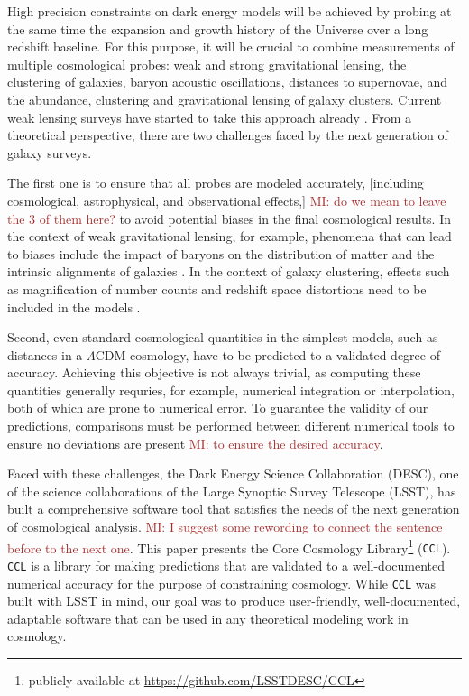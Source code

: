 \documentclass[\docopts]{\docclass}
\newcommand{\mi}[1]{\textcolor{brown}{MI: #1}}
\newcommand{\ccl}{{\tt CCL}\xspace}
\begin{document}
High precision constraints on dark energy models will be achieved by probing at the same time the expansion and growth history of the Universe over a long redshift baseline. For this purpose, it will be crucial to combine measurements of multiple cosmological probes: weak and strong gravitational lensing, the clustering of galaxies, baryon acoustic oscillations, distances to supernovae, and the abundance, clustering and gravitational lensing of galaxy clusters. Current weak lensing surveys have started to take this approach already \citep{Joudaki18,vanUitert18,DEScombined,krause17}. From a theoretical perspective, there are two challenges faced by the next generation of galaxy surveys. 

The first one is to ensure that all probes are modeled accurately, [including cosmological, astrophysical, and observational effects,] \mi{do we mean to leave the 3 of them here?} to avoid potential biases in the final cosmological results. In the context of weak gravitational lensing, for example, phenomena that can lead to biases include the impact of baryons on the distribution of matter and the intrinsic alignments of galaxies \citep[e.g.][]{vanDaalen11,Semboloni11,Troxel14,Krause15,Blazek17}. In the context of galaxy clustering, effects such as magnification of number counts and redshift space distortions need to be included in the models \citep{Alonso15,ghosh18}. 

Second, even standard cosmological quantities in the simplest models, such as distances in a $\Lambda$CDM cosmology, have to be predicted to a validated degree of accuracy. Achieving this objective is not always trivial, as computing these quantities generally requries, for example, numerical integration or interpolation, both of which are prone to numerical error. To guarantee the validity of our predictions, comparisons must be performed between different numerical tools to ensure no deviations are present \mi{to ensure the desired accuracy}. 

Faced with these challenges, the Dark Energy Science Collaboration (DESC), one of the science collaborations of the Large Synoptic Survey Telescope (LSST), has built a comprehensive software tool that satisfies the needs of the next generation of cosmological analysis. \mi{I suggest some rewording to connect the sentence before to the next one}. This paper presents the Core Cosmology Library\footnote{publicly available at \url{https://github.com/LSSTDESC/CCL}} (\ccl). \ccl is a library for making predictions that are validated to a well-documented numerical accuracy for the purpose of constraining cosmology. While \ccl was built with LSST in mind, our goal was to produce user-friendly, well-documented, adaptable software that can be used in any theoretical modeling work in cosmology. 
\end{document}
